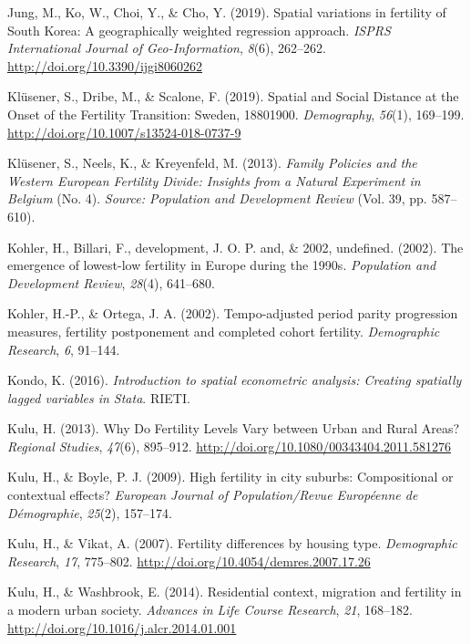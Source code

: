 \documentclass[12pt,twoside]{reedthesis}
\begin{document}
\leavevmode\hypertarget{ref-jung2019}{}%
Jung, M., Ko, W., Choi, Y., \& Cho, Y. (2019). Spatial variations in fertility of South Korea: A geographically weighted regression approach. \emph{ISPRS International Journal of Geo-Information}, \emph{8}(6), 262--262. \url{http://doi.org/10.3390/ijgi8060262}

\leavevmode\hypertarget{ref-klusener2019}{}%
Klüsener, S., Dribe, M., \& Scalone, F. (2019). Spatial and Social Distance at the Onset of the Fertility Transition: Sweden, 18801900. \emph{Demography}, \emph{56}(1), 169--199. \url{http://doi.org/10.1007/s13524-018-0737-9}

\leavevmode\hypertarget{ref-klusener2013}{}%
Klüsener, S., Neels, K., \& Kreyenfeld, M. (2013). \emph{Family Policies and the Western European Fertility Divide: Insights from a Natural Experiment in Belgium} (No. 4). \emph{Source: Population and Development Review} (Vol. 39, pp. 587--610).

\leavevmode\hypertarget{ref-kohler2002b}{}%
Kohler, H., Billari, F., development, J. O. P. and, \& 2002, undefined. (2002). The emergence of lowest-low fertility in Europe during the 1990s. \emph{Population and Development Review}, \emph{28}(4), 641--680.

\leavevmode\hypertarget{ref-kohler2002a}{}%
Kohler, H.-P., \& Ortega, J. A. (2002). Tempo-adjusted period parity progression measures, fertility postponement and completed cohort fertility. \emph{Demographic Research}, \emph{6}, 91--144.

\leavevmode\hypertarget{ref-kondo2016}{}%
Kondo, K. (2016). \emph{Introduction to spatial econometric analysis: Creating spatially lagged variables in Stata}. RIETI.

\leavevmode\hypertarget{ref-kulu2013}{}%
Kulu, H. (2013). Why Do Fertility Levels Vary between Urban and Rural Areas? \emph{Regional Studies}, \emph{47}(6), 895--912. \url{http://doi.org/10.1080/00343404.2011.581276}

\leavevmode\hypertarget{ref-kulu2009}{}%
Kulu, H., \& Boyle, P. J. (2009). High fertility in city suburbs: Compositional or contextual effects? \emph{European Journal of Population/Revue Européenne de Démographie}, \emph{25}(2), 157--174.

\leavevmode\hypertarget{ref-kulu2007}{}%
Kulu, H., \& Vikat, A. (2007). Fertility differences by housing type. \emph{Demographic Research}, \emph{17}, 775--802. \url{http://doi.org/10.4054/demres.2007.17.26}

\leavevmode\hypertarget{ref-kulu2014}{}%
Kulu, H., \& Washbrook, E. (2014). Residential context, migration and fertility in a modern urban society. \emph{Advances in Life Course Research}, \emph{21}, 168--182. \url{http://doi.org/10.1016/j.alcr.2014.01.001}
\end{document}
